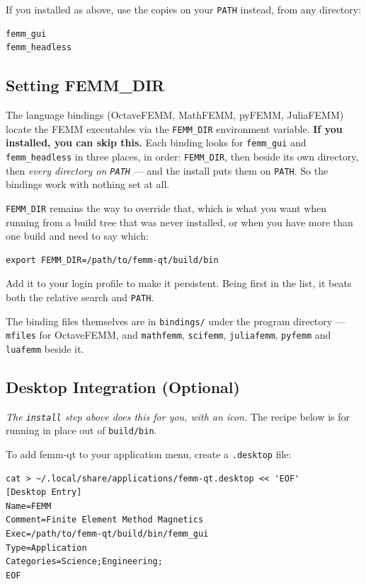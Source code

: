 \documentclass[11pt]{article}
\begin{document}
If you installed as above, use the copies on your \texttt{PATH} instead,
from any directory:
\begin{lstlisting}
femm_gui
femm_headless
\end{lstlisting}

\subsection{Setting FEMM\_DIR}

The language bindings (OctaveFEMM, MathFEMM, pyFEMM, JuliaFEMM) locate
the FEMM executables via the \texttt{FEMM\_DIR} environment variable.
\textbf{If you installed, you can skip this.}  Each binding looks for
\texttt{femm\_gui} and \texttt{femm\_headless} in three places, in order:
\texttt{FEMM\_DIR}, then beside its own directory, then \emph{every
directory on \texttt{PATH}} --- and the install puts them on
\texttt{PATH}.  So the bindings work with nothing set at all.

\texttt{FEMM\_DIR} remains the way to override that, which is what you
want when running from a build tree that was never installed, or when you
have more than one build and need to say which:
\begin{lstlisting}
export FEMM_DIR=/path/to/femm-qt/build/bin
\end{lstlisting}
Add it to your login profile to make it persistent.  Being first in the
list, it beats both the relative search and \texttt{PATH}.

The binding files themselves are in \texttt{bindings/} under the program
directory --- \texttt{mfiles} for OctaveFEMM, and \texttt{mathfemm},
\texttt{scifemm}, \texttt{juliafemm}, \texttt{pyfemm} and
\texttt{luafemm} beside it.

\subsection{Desktop Integration (Optional)}

\emph{The \texttt{install} step above does this for you, with an icon.}
The recipe below is for running in place out of \texttt{build/bin}.

To add femm-qt to your application menu, create a \texttt{.desktop} file:
\begin{lstlisting}
cat > ~/.local/share/applications/femm-qt.desktop << 'EOF'
[Desktop Entry]
Name=FEMM
Comment=Finite Element Method Magnetics
Exec=/path/to/femm-qt/build/bin/femm_gui
Type=Application
Categories=Science;Engineering;
EOF
\end{lstlisting}
\end{document}
